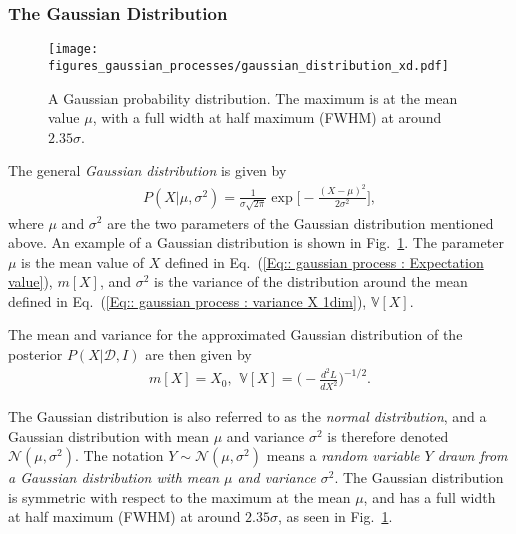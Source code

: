 \documentclass[twoside,english]{uiofysmaster}
\begin{document}
{{\subsubsection{The Gaussian Distribution}\label{Sec:: gaussian process : The Gaussian Distribution}

\begin{figure}
\centering
\texttt{[image: figures\_gaussian\_processes/gaussian\_distribution\_xd.pdf]}
\caption{A Gaussian probability distribution. The maximum is at the mean value $\mu$, with a full width at half maximum (FWHM) at around $2.35 \sigma$. }
\label{Fig:: gaussian process : Gaussian distribution}
\end{figure}

The general \textit{Gaussian distribution} is given by
\begin{align}
P(X| \mu, \sigma^2) = \frac{1}{\sigma \sqrt{2 \pi}} \exp \Bigg[ - \frac{(X- \mu)^2}{2 \sigma^2} \Bigg],
\end{align}
where $\mu$ and $\sigma^2$ are the two parameters of the Gaussian distribution mentioned above. An example of a Gaussian distribution is shown in Fig.~\ref{Fig:: gaussian process : Gaussian distribution}. The parameter $\mu$ is the mean value of $X$ defined in Eq.~(\ref{Eq:: gaussian process : Expectation value}), $ m[X]$, and $\sigma^2$ is the variance of the distribution around the mean defined in Eq.~(\ref{Eq:: gaussian process : variance X 1dim}), $\mathbb{V}[X]$.  

The mean and variance for the approximated Gaussian distribution of the posterior $P(X|\mathcal{D}, I)$ are then given by
\begin{align}
m[X] = X_0\text{, }~ \mathbb{V}[X] = \Big( - \frac{d^2L}{dX^2} \Big)^{-1/2}.
\end{align}

The Gaussian distribution is also referred to as the \textit{normal distribution}, and a Gaussian distribution with mean $\mu$ and variance $\sigma^2$ is therefore denoted $\mathcal{N}(\mu, \sigma^2)$. The notation $Y \sim \mathcal{N}(\mu, \sigma^2)$ means a \textit{random variable $Y$ drawn from a Gaussian distribution with mean $\mu$ and variance $\sigma^2$}. The Gaussian distribution is symmetric with respect to the maximum at the mean $\mu$, and has a full width at half maximum (FWHM) at around $2.35 \sigma$, as seen in Fig.~\ref{Fig:: gaussian process : Gaussian distribution}.  

}}
\end{document}

